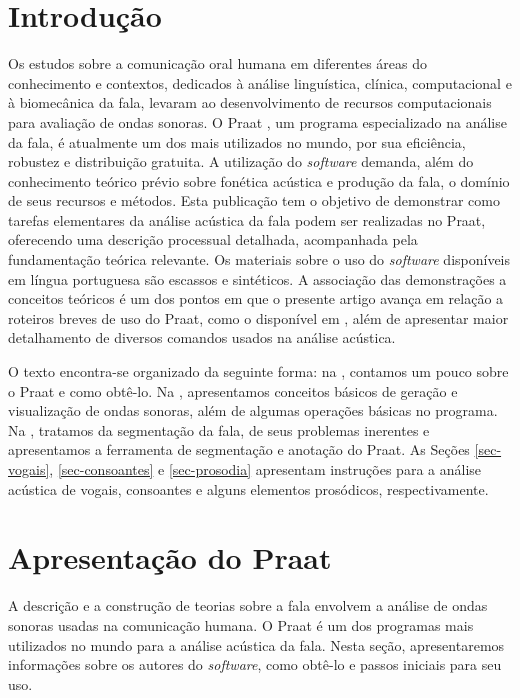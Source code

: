 \documentclass[portuguese]{textolivre}
\begin{document}
\section{Introdução}\label{sec-intro}
Os estudos sobre a comunicação oral humana em diferentes áreas do conhecimento e contextos, dedicados à análise linguística, clínica, computacional e à biomecânica da fala, levaram ao desenvolvimento de recursos computacionais para avaliação de ondas sonoras. O Praat \cite{boersma_2022}, um programa especializado na análise da fala, é atualmente um dos mais utilizados no mundo, por sua eficiência, robustez e distribuição gratuita. A utilização do \textit{software} demanda, além do conhecimento teórico prévio sobre fonética acústica e produção da fala, o domínio de seus recursos e métodos. Esta publicação tem o objetivo de demonstrar como tarefas elementares da análise acústica da fala podem ser realizadas no Praat, oferecendo uma descrição processual detalhada, acompanhada pela fundamentação teórica relevante. Os materiais sobre o uso do \textit{software} disponíveis em língua portuguesa são escassos e sintéticos. A associação das demonstrações a conceitos teóricos é um dos pontos em que o presente artigo avança em relação a roteiros breves de uso do Praat, como o disponível em \textcite{fonologiaOrg}, além de apresentar maior detalhamento de diversos comandos usados na análise acústica.

O texto encontra-se organizado da seguinte forma: na , contamos um pouco sobre o Praat e como obtê-lo. Na , apresentamos conceitos básicos de geração e visualização de ondas sonoras, além de algumas operações básicas no programa. Na , tratamos da segmentação da fala, de seus problemas inerentes e apresentamos a ferramenta de segmentação e anotação do Praat. As Seções \ref{sec-vogais}, \ref{sec-consoantes} e \ref{sec-prosodia} apresentam instruções para a análise acústica de vogais, consoantes e alguns elementos prosódicos, respectivamente. 

\section{Apresentação do Praat}\label{sec-apresentacao-praat}
A descrição e a construção de teorias sobre a fala envolvem a análise de ondas sonoras usadas na comunicação humana. O Praat é um dos programas mais utilizados no mundo para a análise acústica da fala. Nesta seção, apresentaremos informações sobre os autores do \textit{software}, como obtê-lo e passos iniciais para seu uso.
\end{document}
